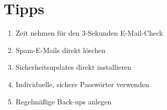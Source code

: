 \section{Tipps}

\begin{frame}
\begin{enumerate}
	\item Zeit nehmen für den 3-Sekunden E-Mail-Check
	\item Spam-E-Mails direkt löschen
	\item Sicherheitsupdates direkt installieren
	\item Individuelle, sichere Passwörter verwenden
	\item Regelmäßige Back-ups anlegen
\end{enumerate}
\end{frame}



